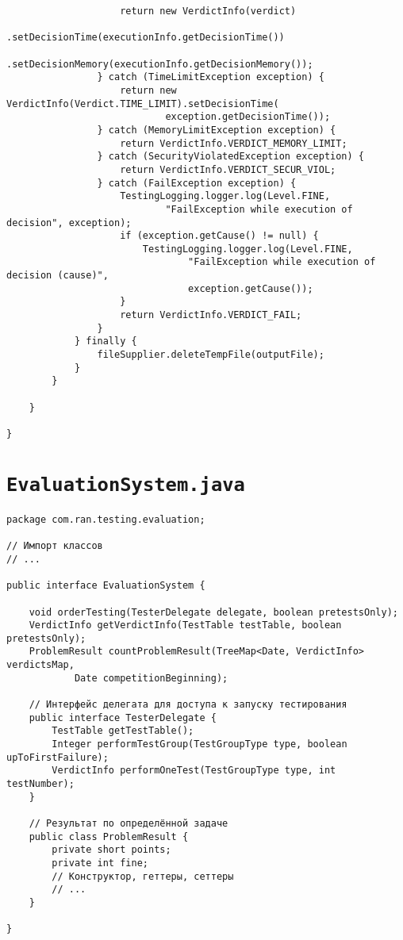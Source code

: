 \begin{verbatim}
                    return new VerdictInfo(verdict)
                            .setDecisionTime(executionInfo.getDecisionTime())
                            .setDecisionMemory(executionInfo.getDecisionMemory());
                } catch (TimeLimitException exception) {
                    return new VerdictInfo(Verdict.TIME_LIMIT).setDecisionTime(
                            exception.getDecisionTime());
                } catch (MemoryLimitException exception) {
                    return VerdictInfo.VERDICT_MEMORY_LIMIT;
                } catch (SecurityViolatedException exception) {
                    return VerdictInfo.VERDICT_SECUR_VIOL;
                } catch (FailException exception) {
                    TestingLogging.logger.log(Level.FINE,
                            "FailException while execution of decision", exception);
                    if (exception.getCause() != null) {
                        TestingLogging.logger.log(Level.FINE,
                                "FailException while execution of decision (cause)",
                                exception.getCause());
                    }
                    return VerdictInfo.VERDICT_FAIL;
                }
            } finally {
                fileSupplier.deleteTempFile(outputFile);
            }
        }
        
    }

}
\end{verbatim}

\section*{\texttt{EvaluationSystem.java}}
\begin{verbatim}
package com.ran.testing.evaluation;

// Импорт классов
// ...

public interface EvaluationSystem {

    void orderTesting(TesterDelegate delegate, boolean pretestsOnly);
    VerdictInfo getVerdictInfo(TestTable testTable, boolean pretestsOnly);
    ProblemResult countProblemResult(TreeMap<Date, VerdictInfo> verdictsMap,
            Date competitionBeginning);

    // Интерфейс делегата для доступа к запуску тестирования
    public interface TesterDelegate {
        TestTable getTestTable();
        Integer performTestGroup(TestGroupType type, boolean upToFirstFailure);
        VerdictInfo performOneTest(TestGroupType type, int testNumber);
    }
    
    // Результат по определённой задаче
    public class ProblemResult {
        private short points;
        private int fine;
        // Конструктор, геттеры, сеттеры
        // ...
    }

}
\end{verbatim}

